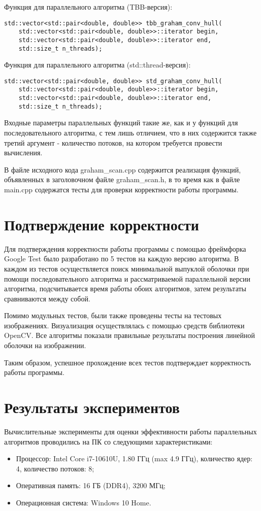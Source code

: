 \documentclass{report}
\begin{document}
\par Функция для параллельного алгоритма (TBB-версия):
\begin{lstlisting}
std::vector<std::pair<double, double>> tbb_graham_conv_hull(
    std::vector<std::pair<double, double>>::iterator begin,
    std::vector<std::pair<double, double>>::iterator end,
    std::size_t n_threads);
\end{lstlisting}
\par Функция для параллельного алгоритма (std::thread-версия):
\begin{lstlisting}
std::vector<std::pair<double, double>> std_graham_conv_hull(
    std::vector<std::pair<double, double>>::iterator begin,
    std::vector<std::pair<double, double>>::iterator end,
    std::size_t n_threads);
\end{lstlisting}
Входные параметры параллельных функций такие же, как и у функций для последовательного алгоритма, с тем лишь отличием, что в них содержится также третий аргумент - количество потоков, на котором требуется провести вычисления.
\par В файле исходного кода graham\_scan.cpp содержится реализация функций, объявленных в заголовочном файле graham\_scan.h, в то время как в файле main.cpp содержатся тесты для проверки корректности работы программы.
\newpage

\section*{Подтверждение корректности}
Для подтверждения корректности работы программы с помощью фреймфорка Google Test было разработано по 5 тестов на каждую версию алгоритма. В каждом из тестов осуществляется поиск минимальной выпуклой оболочки при помощи последовательного алгоритма и рассматриваемой параллельной версии алгоритма, подсчитывается время работы обоих алгоритмов, затем результаты сравниваются между собой.
\par Помимо модульных тестов, были также проведены тесты на тестовых изображениях. Визуализация осуществлялась с помощью средств библиотеки OpenCV. Все алгоритмы показали правильные результаты построения линейной оболочки на изображении.
\par Таким образом, успешное прохождение всех тестов подтверждает корректность работы программы.
\newpage

\section*{Результаты экспериментов}
Вычислительные эксперименты для оценки эффективности работы параллельных алгоритмов проводились на ПК со следующими характеристиками:
\begin{itemize}
\item Процессор: Intel Core i7-10610U, 1.80 ГГц (max 4.9 ГГц), количество ядер: 4, количество потоков: 8;
\item Оперативная память: 16 ГБ (DDR4), 3200 МГц;
\item Операционная система: Windows 10 Home.
\end{itemize}
\end{document}
